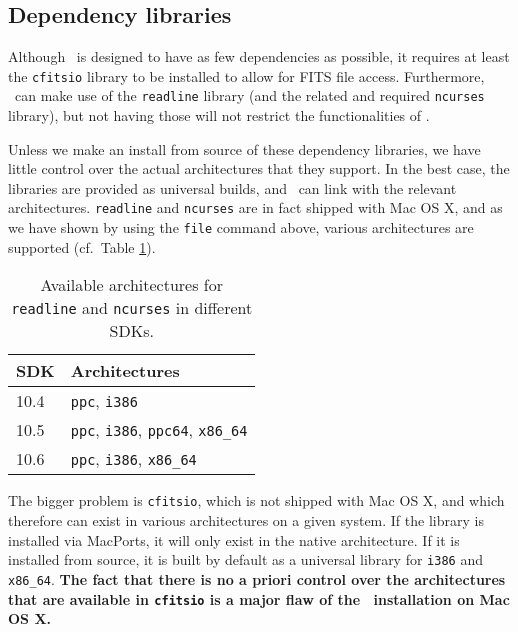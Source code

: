 \documentclass{article}[12pt,a4]
\begin{document}
\subsection{Dependency libraries}
\label{sec:dependencies}

Although \this\ is designed to have as few dependencies as possible, it requires at least the {\tt cfitsio}
library to be installed to allow for FITS file access.
Furthermore, \this\ can make use of the {\tt readline} library (and the related and required {\tt ncurses}
library), but not having those will not restrict the functionalities of \this.

Unless we make an install from source of these dependency libraries, we have little control over the
actual architectures that they support.
In the best case, the libraries are provided as universal builds, and \this\ can link with the relevant
architectures.
{\tt readline} and {\tt ncurses} are in fact shipped with Mac OS X, and as we have shown by using the
{\tt file} command above, various architectures are supported (cf.~Table \ref{table:readline}).

\begin{table}[!h]
  \center
  \begin{tabular}{ll}
  \hline
  SDK & Architectures \\
  \hline
  10.4 & {\tt ppc}, {\tt i386} \\
  10.5 & {\tt ppc}, {\tt i386}, {\tt ppc64}, {\tt x86\_64} \\
  10.6 & {\tt ppc}, {\tt i386}, {\tt x86\_64} \\
  \hline
  \end{tabular}
  \caption{Available architectures for {\tt readline} and {\tt ncurses} in different SDKs.}
  \label{table:readline}
\end{table}

The  bigger problem is {\tt cfitsio}, which is not shipped with Mac OS X, and which therefore can
exist in various architectures on a given system.
If the library is installed via MacPorts, it will only exist in the native architecture.
If it is installed from source, it is built by default as a universal library for {\tt i386} and {\tt x86\_64}.
{\bf The fact that there is no a priori control over the architectures that are available in {\tt cfitsio} is
a major flaw of the \this\ installation on Mac OS X.}
\end{document}
